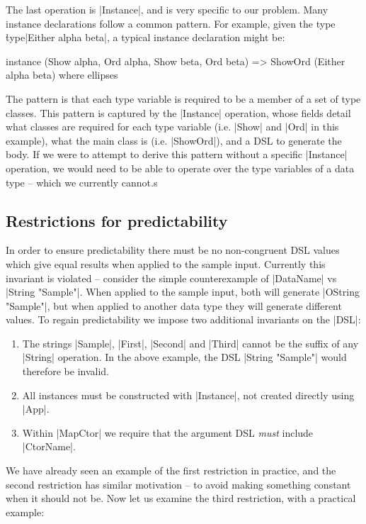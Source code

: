 \documentclass[preprint,draft]{sigplanconf}
\begin{document}
The last operation is |Instance|, and is very specific to our problem. Many instance declarations follow a common pattern. For example, given the type \h{type}|Either alpha beta|, a typical instance declaration might be:

\ignore\begin{code}
instance (Show alpha, Ord alpha, Show beta, Ord beta) =>
    ShowOrd (Either alpha beta) where ellipses
\end{code}

The pattern is that each type variable is required to be a member of a set of type classes. This pattern is captured by the |Instance| operation, whose fields detail what classes are required for each type variable (i.e. |Show| and |Ord| in this example), what the main class is (i.e. |ShowOrd|), and a DSL to generate the body. If we were to attempt to derive this pattern without a specific |Instance| operation, we would need to be able to operate over the type variables of a data type -- which we currently cannot.s

\subsection{Restrictions for predictability}
\label{sec:predictability}

In order to ensure predictability there must be no non-congruent DSL values which give equal results when applied to the sample input. Currently this invariant is violated -- consider the simple counterexample of |DataName| vs |String "Sample"|. When applied to the sample input, both will generate |OString "Sample"|, but when applied to another data  type they will generate different values. To regain predictability we impose two additional invariants on the |DSL|:

\begin{enumerate}
\item The strings |Sample|, |First|, |Second| and |Third| cannot be the suffix of any |String| operation. In the above example, the DSL |String "Sample"| would therefore be invalid.
\item All instances must be constructed with |Instance|, not created directly using |App|.
\item Within |MapCtor| we require that the argument DSL \textit{must} include |CtorName|.
\end{enumerate}

We have already seen an example of the first restriction in practice, and the second restriction has similar motivation -- to avoid making something constant when it should not be. Now let us examine the third restriction, with a practical example:
\end{document}
